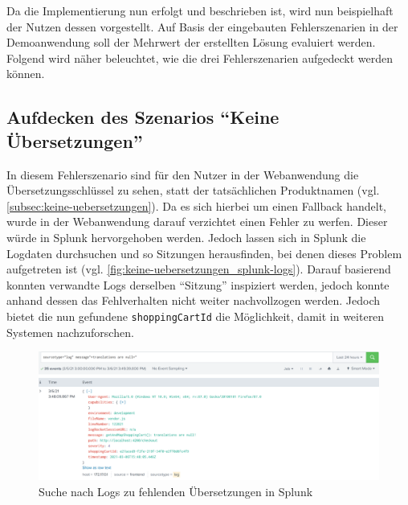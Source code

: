 
Da die Implementierung nun erfolgt und beschrieben ist, wird nun beispielhaft der Nutzen dessen vorgestellt. Auf Basis der eingebauten Fehlerszenarien in der Demoanwendung soll der Mehrwert der erstellten Lösung evaluiert werden. Folgend wird näher beleuchtet, wie die drei Fehlerszenarien aufgedeckt werden können.

\subsection{Aufdecken des Szenarios \enquote{Keine Übersetzungen}}

In diesem Fehlerszenario sind für den Nutzer in der Webanwendung die Übersetzungsschlüssel zu sehen, statt der tatsächlichen Produktnamen (vgl. \autoref{subsec:keine-uebersetzungen}). Da es sich hierbei um einen Fallback handelt, wurde in der Webanwendung darauf verzichtet einen Fehler zu werfen. Dieser würde in Splunk hervorgehoben werden. Jedoch lassen sich in Splunk die Logdaten durchsuchen und so Sitzungen herausfinden, bei denen dieses Problem aufgetreten ist (vgl. \autoref{fig:keine-uebersetzungen_splunk-logs}). Darauf basierend konnten verwandte Logs derselben \enquote{Sitzung} inspiziert werden, jedoch konnte anhand dessen das Fehlverhalten nicht weiter nachvollzogen werden. Jedoch bietet die nun gefundene \texttt{shoppingCartId} die Möglichkeit, damit in weiteren Systemen nachzuforschen.
	
\begin{figure}[H]
	\centering
	\includegraphics[width=1.00\linewidth]{img/05_ergebnis/keine-uebersetzungen_splunk-logs.png}
	\caption{Suche nach Logs zu fehlenden Übersetzungen in Splunk}
	\label{fig:keine-uebersetzungen_splunk-logs}
\end{figure}

